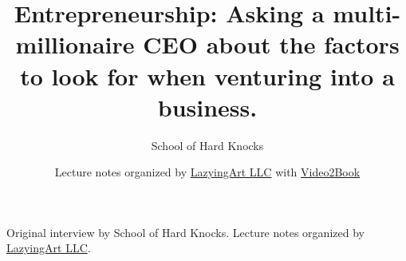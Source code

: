 \documentclass[11pt,oneside]{book}
\begin{document}
\frontmatter
\title{Entrepreneurship: Asking a multi-millionaire CEO about the factors to look for when venturing into a business.}
\author{School of Hard Knocks}
\date{Lecture notes organized by \href{https://lazying.art}{LazyingArt LLC} with \href{https://github.com/lachlanchen/Video2Book}{Video2Book}}
\maketitle
\begin{center}
\small Original interview by School of Hard Knocks. Lecture notes organized by \href{https://lazying.art}{LazyingArt LLC}.
\end{center}
\clearpage
\mainmatter

\end{document}
